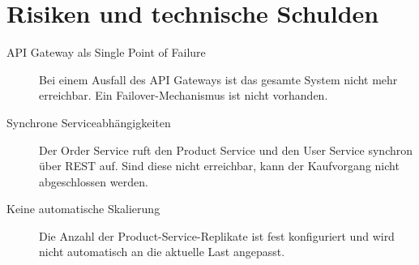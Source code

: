 \section{Risiken und technische Schulden}\label{sec:risiken}

\begin{description}
    \item[API Gateway als Single Point of Failure]
    Bei einem Ausfall des API Gateways ist das gesamte System nicht mehr erreichbar.
    Ein Failover-Mechanismus ist nicht vorhanden.

    \item[Synchrone Serviceabhängigkeiten]
    Der Order Service ruft den Product Service und den User Service synchron über REST auf.
    Sind diese nicht erreichbar, kann der Kaufvorgang nicht abgeschlossen werden.

    \item[Keine automatische Skalierung]
    Die Anzahl der Product-Service-Replikate ist fest konfiguriert und
    wird nicht automatisch an die aktuelle Last angepasst.
\end{description}